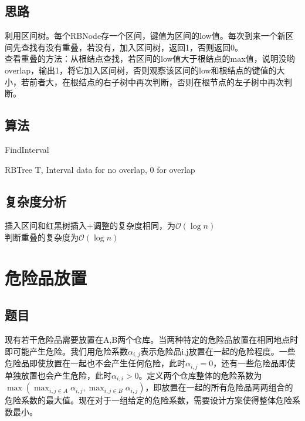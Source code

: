 \documentclass[UTF8]{ctexart}
\begin{document}
\subsection{思路}
利用区间树。每个RBNode存一个区间，键值为区间的low值。每次到来一个新区间先查找有没有重叠，若没有，加入区间树，返回1，否则返回0。\\
查看重叠的方法：从根结点查找，若区间的low值大于根结点的max值，说明没哟overlap，输出1，将它加入区间树，否则观察该区间的low和根结点的键值的大小，若前者大，在根结点的右子树中再次判断，否则在根节点的左子树中再次判断。\\

\subsection{算法}

\renewcommand{\algorithmicrequire}{\textbf{输入:}}
\renewcommand{\algorithmicensure}{\textbf{输出:}}
\begin{algorithm}
	\caption{FindInterval}
	\begin{algorithmic}[1]
	\Require RBTree T, Interval data
	 for no overlap, 0 for overlap 
	\EndIf
	\Else
		\Else
			\Else
			\EndIf
		\EndIf
	\EndIf
	\end{algorithmic}
\end{algorithm}

\subsection{复杂度分析}
插入区间和红黑树插入+调整的复杂度相同，为$\mathcal{O}(\log n)$\\
判断重叠的复杂度为$\mathcal{O}(\log n)$

\section{危险品放置}

\subsection{题目}
现有若干危险品需要放置在A,B两个仓库。当两种特定的危险品放置在相同地点时即可能产生危险。我们用危险系数$\alpha_{i,j}$表示危险品i,j放置在一起的危险程度。一些危险品即使放置在一起也不会产生任何危险，此时$\alpha_{i,j}=0$，还有一些危险品即使单独放置也会产生危险，此时$\alpha_{i,i}>0$。定义两个仓库整体的危险系数为$\max(\max_{i,j\in A}\alpha_{i,j},\max_{i,j\in B}\alpha_{i,j})$，即放置在一起的所有危险品两两组合的危险系数的最大值。现在对于一组给定的危险系数，需要设计方案使得整体危险系数最小。
\end{document}
